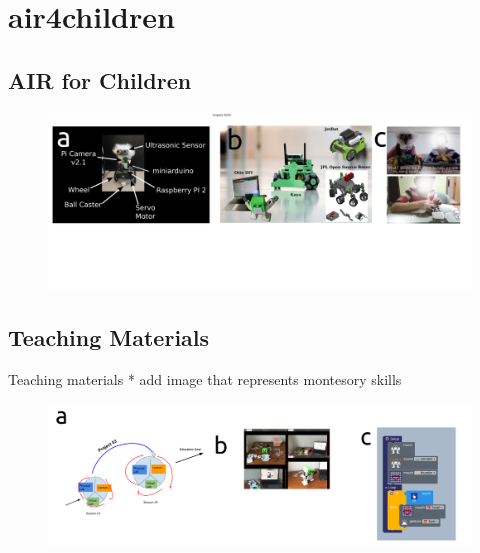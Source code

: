 \section{air4children}

\subsection{AIR for Children}

{
\begin{frame}{}
      \begin{figure}
        \centering
        \includegraphics[width=1.0\textwidth]{./figures/air4children/versions/drawing-v02.png}
      \end{figure}
\end{frame}
}

\subsection{Teaching Materials}

{
\begin{frame}{Teaching materials}
* add image that represents montesory skills
      \begin{figure}
        \centering
        \includegraphics[width=1.0\textwidth]{./figures/teaching-materials/versions/drawing-v01.png}
      \end{figure}
\end{frame}
}


